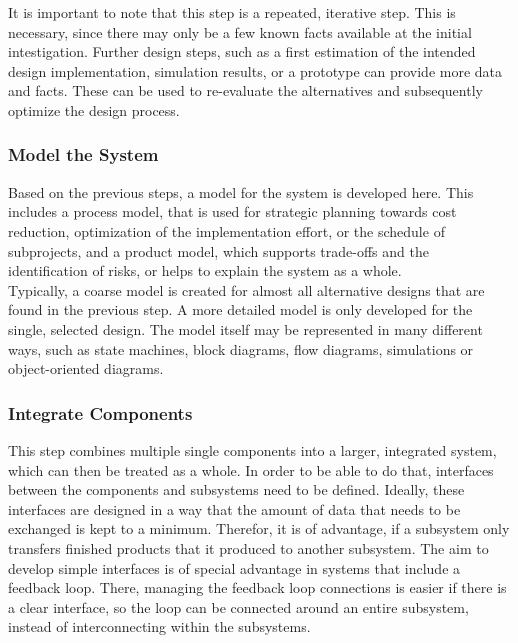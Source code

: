 It is important to note that this step is a repeated, iterative step.
This is necessary, since there may only be a few known facts available at the initial intestigation.
Further design steps, such as a first estimation of the intended design implementation, simulation results, or a prototype can provide more data and facts.
These can be used to re-evaluate the alternatives and subsequently optimize the design process.


\subsubsection{Model the System}

\hspace{5mm} Based on the previous steps, a model for the system is developed here.
This includes a process model, that is used for strategic planning towards cost reduction, optimization of the implementation effort, or the schedule of subprojects, and a product model, which supports trade-offs and the identification of risks, or helps to explain the system as a whole.\\

Typically, a coarse model is created for almost all alternative designs that are found in the previous step.
A more detailed model is only developed for the single, selected design.
The model itself may be represented in many different ways, such as state machines, block diagrams, flow diagrams, simulations or object-oriented diagrams.

\subsubsection{Integrate Components}

\hspace{5mm} This step combines multiple single components into a larger, integrated system, which can then be treated as a whole.
In order to be able to do that, interfaces between the components and subsystems need to be defined.
Ideally, these interfaces are designed in a way that the amount of data that needs to be exchanged is kept to a minimum.
Therefor, it is of advantage, if a subsystem only transfers finished products that it produced to another subsystem.
The aim to develop simple interfaces is of special advantage in systems that include a feedback loop.
There, managing the feedback loop connections is easier if there is a clear interface, so the loop can be connected around an entire subsystem, instead of interconnecting within the subsystems.

